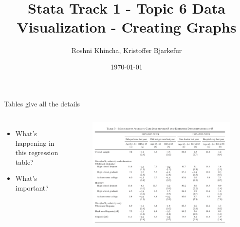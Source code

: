 \documentclass[aspectratio=169]{beamer}
\title{Stata Track 1 - Topic 6 \newline Data Visualization - \newline Creating Graphs}
\date{\today}
\author{Roshni Khincha, Kristoffer Bjarkefur} %
\institute{Development Impact Evaluation (DIME) \newline The World Bank }
\begin{document}
	{
		\maketitle
	}

\begin{frame}[fragile]{Tables give all the details}
	\begin{columns}[c]
		\begin{itemize}
			\item What’s happening in this regression table?
			\item What’s important?
		\end{itemize}
		\begin{figure}
			\centering
			\includegraphics[width=\linewidth]{img/regtable}
		\end{figure}
	\end{columns}
\end{frame}
\end{document}
